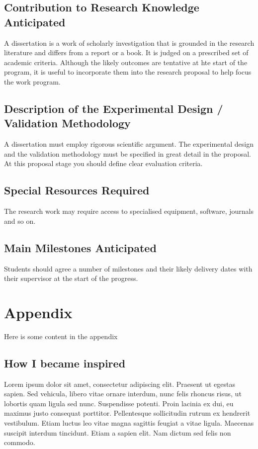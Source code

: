 \documentclass[runningheads,a4paper]{llncs}
\begin{document}
%
\newpage
%
\subsection{Contribution to Research Knowledge Anticipated}
%
A dissertation is a work of scholarly investigation that is grounded in the research literature and differs from a report or a book. It is judged on a prescribed set of academic criteria. Although the likely outcomes are tentative at hte start of the program, it is useful to incorporate them into the research proposal to help focus the work program.

%
\newpage
%
\subsection{Description of the Experimental Design / Validation Methodology}
%
A dissertation must employ rigorous scientific argument. The experimental design and the validation methodology must be specified in great detail in the proposal. At this proposal stage you should define clear evaluation criteria.

%
\newpage
%
\subsection{Special Resources Required}
%
The research work may require access to specialised equipment, software, journals and so on.

%
\newpage
%
\subsection{Main Milestones Anticipated}
%
Students should agree a number of milestones and their likely delivery dates with their supervisor at the start of the progress.

%
\newpage
%


%
\newpage
%
\appendix
\section{Appendix}
Here is some content in the appendix

\begin{subappendices}
\subsection{How I became inspired}
Lorem ipsum dolor sit amet, consectetur adipiscing elit. Praesent ut egestas sapien. Sed vehicula, libero vitae ornare interdum, nunc felis rhoncus risus, ut lobortis quam ligula sed nunc. Suspendisse potenti. Proin lacinia ex dui, eu maximus justo consequat porttitor. Pellentesque sollicitudin rutrum ex hendrerit vestibulum. Etiam luctus leo vitae magna sagittis feugiat a vitae ligula. Maecenas suscipit interdum tincidunt. Etiam a sapien elit. Nam dictum sed felis non commodo.

%
\end{subappendices}
\end{document}
